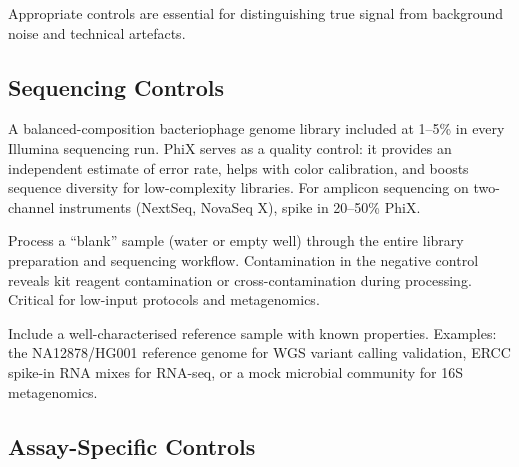 Appropriate controls are essential for distinguishing true signal from background noise and technical artefacts.

\subsection{Sequencing Controls}

\begin{description}[style=nextline, font=\bfseries, itemsep=3pt]
  \item[PhiX spike-in]
  A balanced-composition bacteriophage genome library included at 1--5\% in every Illumina sequencing run. PhiX serves as a quality control: it provides an independent estimate of error rate, helps with color calibration, and boosts sequence diversity for low-complexity libraries. For amplicon sequencing on two-channel instruments (NextSeq, NovaSeq X), spike in 20--50\% PhiX.

  \item[Negative controls (no-template controls)]
  Process a ``blank'' sample (water or empty well) through the entire library preparation and sequencing workflow. Contamination in the negative control reveals kit reagent contamination or cross-contamination during processing. Critical for low-input protocols and metagenomics.

  \item[Positive controls]
  Include a well-characterised reference sample with known properties. Examples: the NA12878/HG001 reference genome for WGS variant calling validation, ERCC spike-in RNA mixes for RNA-seq, or a mock microbial community for 16S metagenomics.
\end{description}

\subsection{Assay-Specific Controls}

